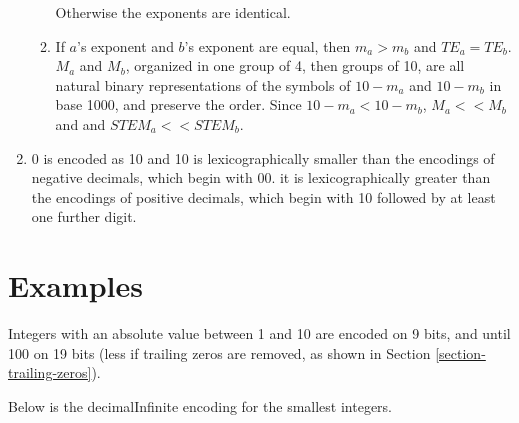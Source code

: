 \documentclass[final,leqno,onefignum,onetabnum]{siamltex1213}
\begin{document}
\begin{enumerate}
\begin{enumerate}
  Otherwise the exponents are identical.
  \item If $a$'s exponent and $b$'s exponent are equal, then $m_a > m_b$ and $TE_a=TE_b$. $M_a$ and $M_b$, organized in one group of 4, then groups of 10, are all natural binary representations of the symbols of $10-m_a$ and $10-m_b$ in base 1000, and preserve the order. Since $10-m_a < 10-m_b$, $M_a<<M_b$ and and $STEM_a << STEM_b$.
  \end{enumerate}
\item 0 is encoded as 10 and 10 is lexicographically smaller than the encodings of negative decimals, which begin with 00. it is lexicographically greater than the encodings of positive decimals, which begin with 10 followed by at least one further digit.
\end{enumerate}

\section{Examples}
\label{section-examples}

Integers with an absolute value between 1 and 10 are encoded on 9 bits, and until 100 on 19 bits (less if trailing zeros are removed, as shown in Section \ref{section-trailing-zeros}).

Below is the decimalInfinite encoding for the smallest integers. 
\end{document}
